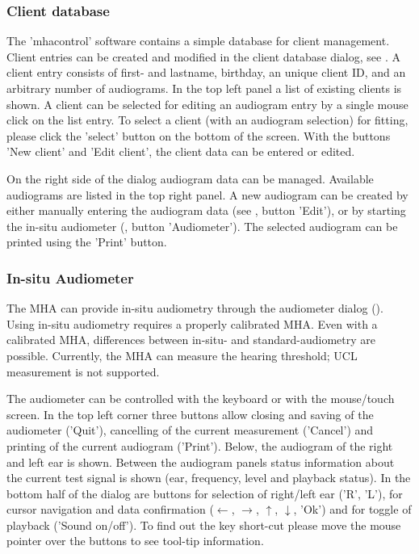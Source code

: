 \documentclass[11pt,a4paper,twoside]{article}
\newcommand{\+}{\discretionary{\mbox{\scriptsize$\hookleftarrow$}}{}{}}
\begin{document}
\subsubsection*{Client database}

The 'mhacontrol' software contains a simple database for client management.
%
Client entries can be created and modified in the client database
dialog, see .
%
A client entry consists of first- and lastname, birthday, an unique
client ID, and an arbitrary number of
audiograms.
%
In the top left panel a list of existing clients is shown.
%
A client can be selected for editing an audiogram entry by a single
mouse click on the list entry.
%
To select a client (with an audiogram selection) for fitting, please
click the 'select' button on the bottom of the screen.
%
With the buttons 'New client' and 'Edit client', the client data can
be entered or edited.


On the right side of the dialog audiogram data can be managed.
%
Available audiograms are listed in the top right panel.
%
A new audiogram can be created by either manually entering the
audiogram data (see , button
'Edit'), or by starting the in-situ audiometer
(, button 'Audiometer').
%
The selected audiogram can be printed using the 'Print' button.

\subsubsection*{In-situ Audiometer}%

The MHA can provide in-situ audiometry through the audiometer dialog
().
%
Using in-situ audiometry requires a properly calibrated MHA.
%
Even with a calibrated MHA, differences between in-situ- and
standard-audiometry are possible.
%
Currently, the MHA can measure the hearing threshold; UCL
measurement is not supported.

The audiometer can be controlled with the keyboard or with the
mouse/touch screen.
%
In the top left corner three buttons allow closing and saving of the
audiometer ('Quit'), cancelling of the current measurement ('Cancel')
and printing of the current audiogram ('Print').
%
Below, the audiogram of the right and left ear is shown.
%
Between the audiogram panels status information about the current test
signal is shown (ear, frequency, level and playback status).
%
In the bottom half of the dialog are buttons for selection of
right/left ear ('R', 'L'), for cursor navigation and data confirmation
($\leftarrow$, $\rightarrow$, $\uparrow$, $\downarrow$, 'Ok') and for
toggle of playback ('Sound on/off').
%
To find out the key short-cut please move the mouse pointer over the
buttons to see tool-tip information.
\end{document}
